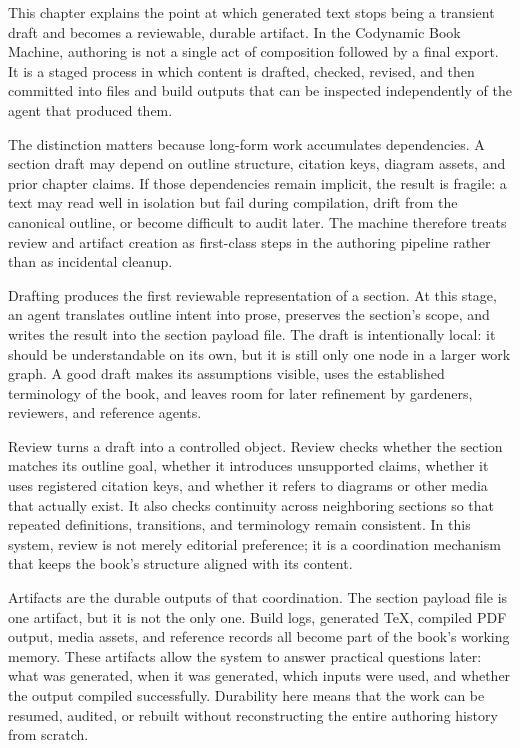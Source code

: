 \documentclass[11pt]{article}
\begin{document}

This chapter explains the point at which generated text stops being a transient draft and becomes a reviewable, durable artifact. In the Codynamic Book Machine, authoring is not a single act of composition followed by a final export. It is a staged process in which content is drafted, checked, revised, and then committed into files and build outputs that can be inspected independently of the agent that produced them.

The distinction matters because long-form work accumulates dependencies. A section draft may depend on outline structure, citation keys, diagram assets, and prior chapter claims. If those dependencies remain implicit, the result is fragile: a text may read well in isolation but fail during compilation, drift from the canonical outline, or become difficult to audit later. The machine therefore treats review and artifact creation as first-class steps in the authoring pipeline rather than as incidental cleanup.

Drafting produces the first reviewable representation of a section. At this stage, an agent translates outline intent into prose, preserves the section's scope, and writes the result into the section payload file. The draft is intentionally local: it should be understandable on its own, but it is still only one node in a larger work graph. A good draft makes its assumptions visible, uses the established terminology of the book, and leaves room for later refinement by gardeners, reviewers, and reference agents.

Review turns a draft into a controlled object. Review checks whether the section matches its outline goal, whether it introduces unsupported claims, whether it uses registered citation keys, and whether it refers to diagrams or other media that actually exist. It also checks continuity across neighboring sections so that repeated definitions, transitions, and terminology remain consistent. In this system, review is not merely editorial preference; it is a coordination mechanism that keeps the book's structure aligned with its content.

Artifacts are the durable outputs of that coordination. The section payload file is one artifact, but it is not the only one. Build logs, generated \TeX{}, compiled PDF output, media assets, and reference records all become part of the book's working memory. These artifacts allow the system to answer practical questions later: what was generated, when it was generated, which inputs were used, and whether the output compiled successfully. Durability here means that the work can be resumed, audited, or rebuilt without reconstructing the entire authoring history from scratch.
\end{document}

